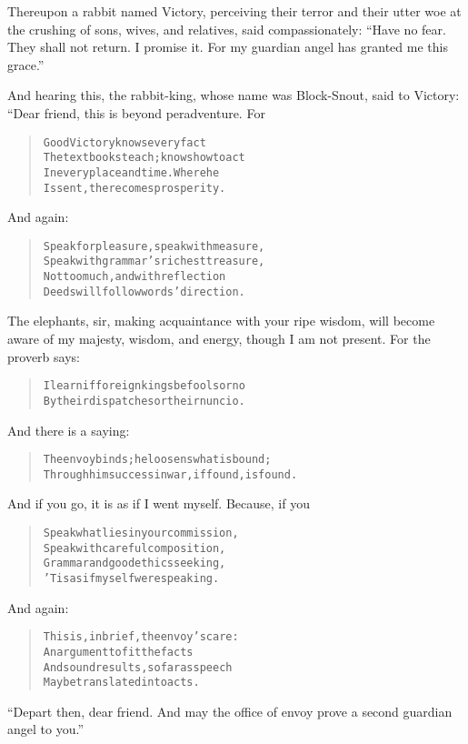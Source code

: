 \documentclass[article, twoside, 14pt]{memoir}
\renewenvironment{verbatim}{%
\begin{quote}%
\vskip -10pt%
\begin{alltt}\normalfont\large}{\end{alltt}%
\end{quote}%
\vskip -10pt
} %
\begin{document}
Thereupon a rabbit named Victory, perceiving their terror and their
utter woe at the crushing of sons, wives, and relatives, said
compassionately:
``Have no fear. They shall not return. I promise it. For my guardian angel has granted me this grace.''

And hearing this, the rabbit-king, whose name was Block-Snout, said
to Victory: “Dear friend, this is beyond peradventure. For

\begin{verbatim}
Good Victory knows every fact
The textbooks teach; knows how to act
In every place and time. Where he
Is sent, there comes prosperity.
\end{verbatim}
And again:

\begin{verbatim}
Speak for pleasure, speak with measure,
Speak with grammar's richest treasure,
Not too much, and with reflection{\textemdash}
Deeds will follow words' direction.
\end{verbatim}
The elephants, sir, making acquaintance with your ripe wisdom, will
become aware of my majesty, wisdom, and energy, though I am not
present. For the proverb says:

\begin{verbatim}
I learn if foreign kings be fools or no
By their dispatches or their nuncio.
\end{verbatim}
And there is a saying:

\begin{verbatim}
The envoy binds; he loosens what is bound;
Through him success in war, if found, is found.
\end{verbatim}
And if you go, it is as if I went myself. Because, if you

\begin{verbatim}
Speak what lies in your commission,
Speak with careful composition,
Grammar and good ethics seeking,
'Tis as if myself were speaking.
\end{verbatim}
And again:

\begin{verbatim}
This is, in brief, the envoy's care:
    An argument to fit the facts
And sound results, so far as speech
    May be translated into acts.
\end{verbatim}
``Depart then, dear friend. And may the office of envoy prove a second guardian angel to you.''
\end{document}
